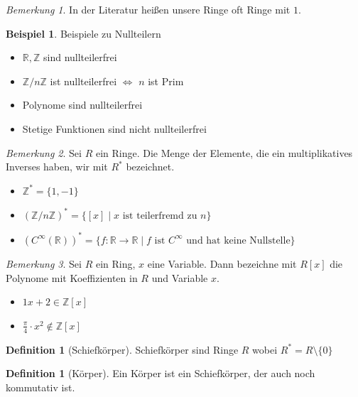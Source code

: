 \documentclass[12pt,parskip=full]{scrartcl}
\newcommand{\setZ}{\mathbb{Z}}
\newcommand{\setR}{\mathbb{R}}
\theoremstyle{definition}
\newtheorem{definition}[theorem]{Definition}
\newtheorem{example}[theorem]{Beispiel}
\theoremstyle{remark}
\newtheorem*{remark}{Bemerkung}
\begin{document}
	\begin{remark}
		In der Literatur heißen unsere Ringe oft Ringe mit $1$.
	\end{remark}

	\begin{example}
		Beispiele zu Nullteilern
		\begin{itemize}
			\item $\setR, \setZ$ sind nullteilerfrei
			\item $\setZ / n \setZ$ ist nullteilerfrei $\Leftrightarrow$ $n$ ist Prim
			\item Polynome sind nullteilerfrei
			\item Stetige Funktionen sind nicht nullteilerfrei
		\end{itemize}
	\end{example}

	\begin{remark}
		Sei $R$ ein Ringe. Die Menge der Elemente, die ein multiplikatives Inverses haben, wir mit $R^*$ bezeichnet.
		
		\begin{itemize}
			\item $\setZ^* = \{ 1, -1 \}$
			\item $(\setZ / n \setZ)^* = \{ [x] \mid x \text{ ist teilerfremd zu } n \}$
			\item $(C^\infty(\setR))^* = \{ f: \setR \to \setR \mid \text{$f$ ist $C^\infty$ und hat keine Nullstelle} \}$
		\end{itemize}
	\end{remark}

	\begin{remark}
		Sei $R$ ein Ring, $x$ eine Variable. Dann bezeichne mit $R[x]$ die Polynome mit Koeffizienten in $R$ und Variable $x$.
		
		\begin{itemize}
			\item $1x + 2 \in \setZ[x]$
			\item $\displaystyle\frac{\pi}{4} \cdot x^2 \notin \setZ[x]$
		\end{itemize}
	\end{remark}

	\begin{definition}[Schiefkörper]
		Schiefkörper sind Ringe $R$ wobei $R^* = R \setminus \{ 0 \}$
	\end{definition}

	\begin{definition}[Körper]
		Ein Körper ist ein Schiefkörper, der auch noch kommutativ ist.
	\end{definition}
\end{document}
